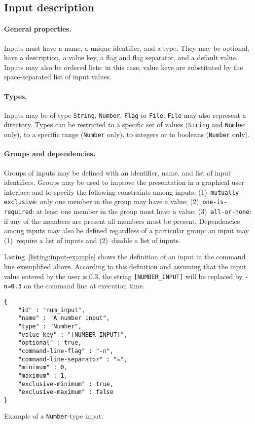 \documentclass{article}
\begin{document}
\subsection{Input description}

\paragraph{General properties.} Inputs must have a name, a unique
identifier, and a type. They may be optional, have a description, a
value key, a flag and flag separator, and a default value. Inputs may
also be ordered lists: in this case, value keys are substituted by the
space-separated list of input values.

\paragraph{Types.} Inputs may be of type \texttt{String}, \texttt{Number},
\texttt{Flag} or \texttt{File}. \texttt{File} may also represent a directory.
Types can be restricted to a specific set of values (\texttt{String} 
and \texttt{Number} only), to a specific range (\texttt{Number} only), to
integers or to booleans (\texttt{Number} only).

\paragraph{Groups and dependencies.} Groups of inputs may be defined
with an identifier, name, and list of input identifiers. Groups may be
used to improve the presentation in a graphical user interface and to
specify the following constraints among inputs:
(1)~\texttt{mutually-exclusive}: only one member in the group may have a
value; (2)~\texttt{one-is-required}: at least one member in the group
must have a value; (3)~\texttt{all-or-none}: if any of the members are
present all members must be present. Dependencies among inputs may also be
defined regardless of a particular group: an input may (1)~require a list of
inputs and (2)~disable a list of inputs.

Listing~\ref{listing:input-example} shows the definition of an input in the
command line exemplified above. According to this definition and assuming
that the input value entered by the user is 0.3, the string
\texttt{[NUMBER\_INPUT]} will be replaced by \texttt{-n=0.3} on the command
line at execution time.
\begin{listing}
\begin{verbatim}
{
    "id" : "num_input",
    "name" : "A number input",
    "type" : "Number",
    "value-key" : "[NUMBER_INPUT]",
    "optional" : true,
    "command-line-flag" : "-n",
    "command-line-separator" : "=",
    "minimum" : 0,
    "maximum" : 1,
    "exclusive-minimum" : true,
    "exclusive-maximum" : false
}
\end{verbatim}
\caption{Example of a \texttt{Number}-type input.} 
\label{listing:input-example}
\end{listing}
\end{document}
